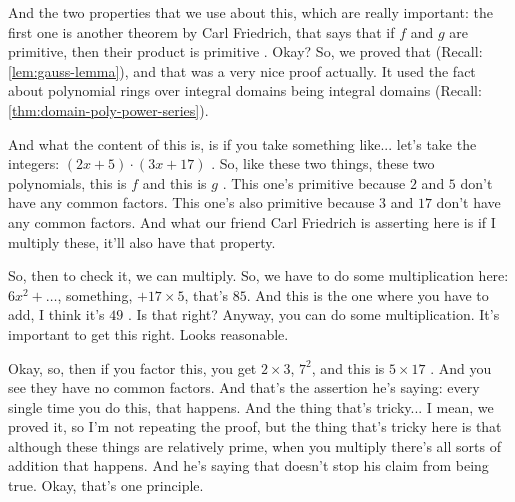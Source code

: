\begin{speech}[00:08:12 - 00:10:18]
And the two properties that we use about this, which are really important: the first one is another theorem by Carl Friedrich, that says that if $f$ and $g$ are primitive, then their product is primitive . Okay? So, we proved that (Recall: \cref{lem:gauss-lemma}), and that was a very nice proof actually. It used the fact about polynomial rings over integral domains being integral domains (Recall: \cref{thm:domain-poly-power-series}).

And what the content of this is, is if you take something like... let's take the integers: $(2x + 5) \cdot (3x + 17)$ . So, like these two things, these two polynomials, this is $f$ and this is $g$ . This one's primitive because $2$ and $5$ don't have any common factors. This one's also primitive because $3$ and $17$ don't have any common factors. And what our friend Carl Friedrich is asserting here is if I multiply these, it'll also have that property.

So, then to check it, we can multiply. So, we have to do some multiplication here: $6x^2 + \dots$, something, $+ 17 \times 5$, that's $85$. And this is the one where you have to add, I think it's $49$ . Is that right? Anyway, you can do some multiplication. It's important to get this right. Looks reasonable.

Okay, so, then if you factor this, you get $2 \times 3$, $7^2$, and this is $5 \times 17$ . And you see they have no common factors. And that's the assertion he's saying: every single time you do this, that happens. And the thing that's tricky... I mean, we proved it, so I'm not repeating the proof, but the thing that's tricky here is that although these things are relatively prime, when you multiply there's all sorts of addition that happens. And he's saying that doesn't stop his claim from being true. Okay, that's one principle.
\end{speech}


